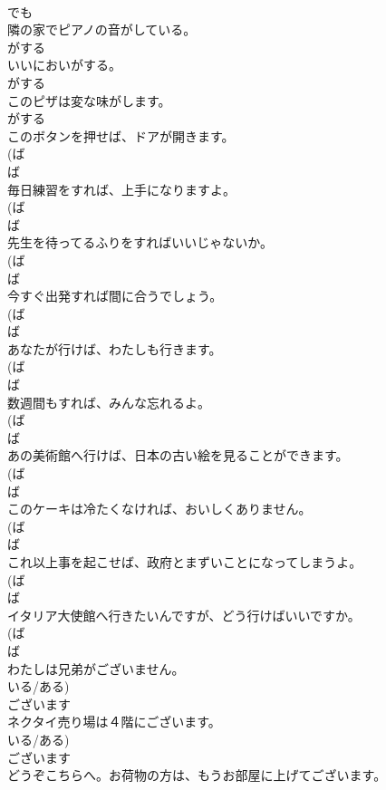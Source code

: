 \documentclass[8pt]{extreport}
\begin{document}
\begin{CJK}{UTF8}{min}
\\	でも
\\	隣の家でピアノの音がしている。	
\\	がする
\\	いいにおいがする。	
\\	がする
\\	このピザは変な味がします。	
\\	がする
\\	このボタンを押せば、ドアが開きます。	
\\	(ば 
\\	ば
\\	毎日練習をすれば、上手になりますよ。	
\\	(ば 
\\	ば
\\	先生を待ってるふりをすればいいじゃないか。	
\\	(ば 
\\	ば
\\	今すぐ出発すれば間に合うでしょう。	
\\	(ば 
\\	ば
\\	あなたが行けば、わたしも行きます。	
\\	(ば 
\\	ば
\\	数週間もすれば、みんな忘れるよ。	
\\	(ば 
\\	ば
\\	あの美術館へ行けば、日本の古い絵を見ることができます。	
\\	(ば 
\\	ば
\\	このケーキは冷たくなければ、おいしくありません。	
\\	(ば 
\\	ば
\\	これ以上事を起こせば、政府とまずいことになってしまうよ。	
\\	(ば 
\\	ば
\\	イタリア大使館へ行きたいんですが、どう行けばいいですか。	
\\	(ば 
\\	ば
\\	わたしは兄弟がございません。	
\\	いる/ある)	
\\	ございます
\\	ネクタイ売り場は４階にございます。	
\\	いる/ある)	
\\	ございます
\\	どうぞこちらへ。お荷物の方は、もうお部屋に上げてございます。	

\end{CJK}
\end{document}
